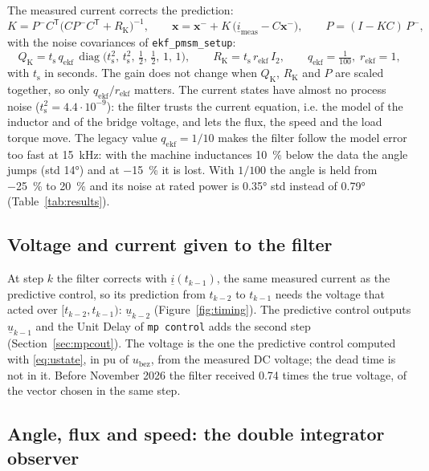 \documentclass[11pt,a4paper]{scrartcl}
\newcommand{\ped}[1]{_{\mathrm{#1}}}
\newcommand{\code}[1]{\texttt{#1}}
\newcommand{\T}{^{\mathsf{T}}}
\begin{document}
\begin{onehalfspace}
The measured current corrects the prediction:
\begin{equation}
	K = P^-C\T\big(C P^- C\T + R\ped{K}\big)^{-1}, \qquad
	\bm{x} = \bm{x}^- + K\,\big(\underline{i}\ped{meas} - C\bm{x}^-\big), \qquad
	P = (I - K C)\,P^- ,
	\label{eq:correction}
\end{equation}
with the noise covariances of \code{ekf\_pmsm\_setup}:
\begin{equation}
	Q\ped{K} = t\ped{s}\,q\ped{ekf}\,\operatorname{diag}\!\big(t\ped{s}^2,\, t\ped{s}^2,\, \tfrac12,\, \tfrac12,\, 1,\, 1\big), \qquad
	R\ped{K} = t\ped{s}\,r\ped{ekf}\,I_2, \qquad q\ped{ekf} = \tfrac{1}{100},\; r\ped{ekf} = 1,
	\label{eq:noise}
\end{equation}
with $t\ped{s}$ in seconds. The gain does not change when $Q\ped{K}$, $R\ped{K}$ and $P$ are scaled together, so only $q\ped{ekf}/r\ped{ekf}$ matters. The current states have almost no process noise ($t\ped{s}^2 = 4.4\cdot10^{-9}$): the filter trusts the current equation, i.e. the model of the inductor and of the bridge voltage, and lets the flux, the speed and the load torque move. The legacy value $q\ped{ekf} = 1/10$ makes the filter follow the model error too fast at \SI{15}{\kilo\hertz}: with the machine inductances \SI{10}{\percent} below the data the angle jumps (std \ang{14}) and at \SI{-15}{\percent} it is lost. With $1/100$ the angle is held from \SI{-25}{\percent} to \SI{+20}{\percent} and its noise at rated power is \ang{0.35} std instead of \ang{0.79} (Table~\ref{tab:results}).

\subsection{Voltage and current given to the filter}
\label{sec:ekftiming}

At step $k$ the filter corrects with $\underline{i}(t_{k-1})$, the same measured current as the predictive control, so its prediction from $t_{k-2}$ to $t_{k-1}$ needs the voltage that acted over $[t_{k-2}, t_{k-1})$: $\underline{u}_{k-2}$ (Figure~\ref{fig:timing}). The predictive control outputs $\underline{u}_{k-1}$ and the Unit Delay of \code{mp control} adds the second step (Section~\ref{sec:mpcout}). The voltage is the one the predictive control computed with \eqref{eq:ustate}, in pu of $u\ped{bez}$, from the measured DC voltage; the dead time is not in it. Before November 2026 the filter received 0.74 times the true voltage, of the vector chosen in the same step.

\subsection{Angle, flux and speed: the double integrator observer}
\label{sec:speed}


\end{onehalfspace}
\end{document}
